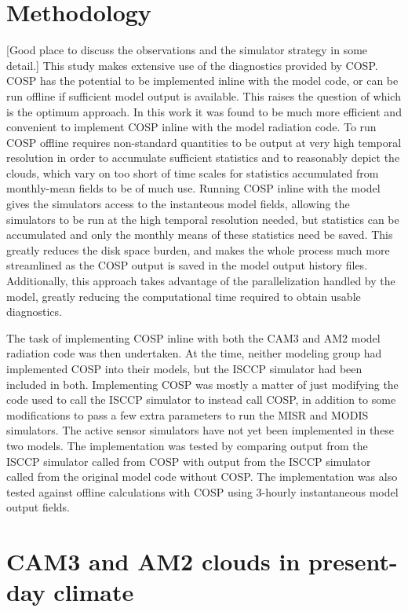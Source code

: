 \chapter{Methodology}
[Good place to discuss the observations and the simulator strategy in some detail.]
This study makes extensive use of the diagnostics provided by COSP. COSP has the potential to be implemented inline with the model code, or can be run offline if sufficient model output is available. This raises the question of which is the optimum approach. In this work it was found to be much more efficient and convenient to implement COSP inline with the model radiation code. To run COSP offline requires non-standard quantities to be output at very high temporal resolution in order to accumulate sufficient statistics and to reasonably depict the clouds, which vary on too short of time scales for statistics accumulated from monthly-mean fields to be of much use. Running COSP inline with the model gives the simulators access to the instanteous model fields, allowing the simulators to be run at the high temporal resolution needed, but statistics can be accumulated and only the monthly means of these statistics need be saved. This greatly reduces the disk space burden, and makes the whole process much more streamlined as the COSP output is saved in the model output history files. Additionally, this approach takes advantage of the parallelization handled by the model, greatly reducing the computational time required to obtain usable diagnostics.

The task of implementing COSP inline with both the CAM3 and AM2 model radiation code was then undertaken. At the time, neither modeling group had implemented COSP into their models, but the ISCCP simulator had been included in both. Implementing COSP was mostly a matter of just modifying the code used to call the ISCCP simulator to instead call COSP, in addition to some modifications to pass a few extra parameters to run the MISR and MODIS simulators. The active sensor simulators have not yet been implemented in these two models. The implementation was tested by comparing output from the ISCCP simulator called from COSP with output from the ISCCP simulator called from the original model code without COSP. The implementation was also tested against offline calculations with COSP using 3-hourly instantaneous model output fields.


\chapter{CAM3 and AM2 clouds in present-day climate}
